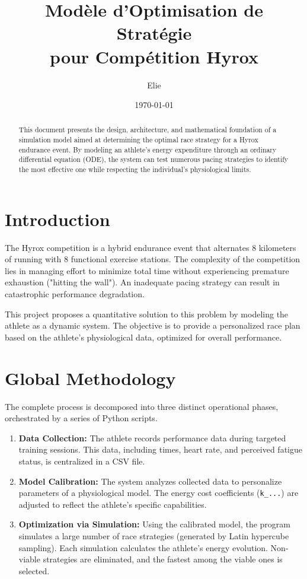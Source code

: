 \documentclass[11pt, a4paper]{article}
\title{\textbf{Modèle d'Optimisation de Stratégie \\ pour Compétition Hyrox}}
\author{Elie}
\date{\today}
\begin{document}
	
	\maketitle
	
	\begin{abstract}
		This document presents the design, architecture, and mathematical foundation of a simulation model aimed at determining the optimal race strategy for a Hyrox endurance event. By modeling an athlete's energy expenditure through an ordinary differential equation (ODE), the system can test numerous pacing strategies to identify the most effective one while respecting the individual's physiological limits.
	\end{abstract}
	
	\section{Introduction}
	The Hyrox competition is a hybrid endurance event that alternates 8 kilometers of running with 8 functional exercise stations. The complexity of the competition lies in managing effort to minimize total time without experiencing premature exhaustion ("hitting the wall"). An inadequate pacing strategy can result in catastrophic performance degradation.
	
	This project proposes a quantitative solution to this problem by modeling the athlete as a dynamic system. The objective is to provide a personalized race plan based on the athlete's physiological data, optimized for overall performance.
	
	\section{Global Methodology}
	The complete process is decomposed into three distinct operational phases, orchestrated by a series of Python scripts.
	
	\begin{enumerate}
		\item \textbf{Data Collection:} The athlete records performance data during targeted training sessions. This data, including times, heart rate, and perceived fatigue status, is centralized in a CSV file.
		
		\item \textbf{Model Calibration:} The system analyzes collected data to personalize parameters of a physiological model. The energy cost coefficients (\texttt{k\_...}) are adjusted to reflect the athlete's specific capabilities.
		
		\item \textbf{Optimization via Simulation:} Using the calibrated model, the program simulates a large number of race strategies (generated by Latin hypercube sampling). Each simulation calculates the athlete's energy evolution. Non-viable strategies are eliminated, and the fastest among the viable ones is selected.
	\end{enumerate}
	
\end{document}
